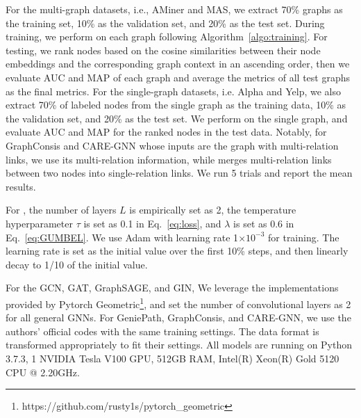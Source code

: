 For the multi-graph datasets, i.e., AMiner and MAS, we extract 70\% graphs as the training set, 10\% as the validation set, and 20\% as the test set. During training, we perform \smodel on each graph following Algorithm~\ref{algo:training}. For testing, we rank nodes based on the cosine similarities between their node embeddings and the corresponding graph context in an ascending order, then we evaluate AUC and MAP of each graph and average the metrics of all test graphs as the final metrics. 
For the single-graph datasets, i.e. Alpha and Yelp, we also extract 70\% of labeled nodes from the single graph as the training data, 10\% as the validation set, and 20\% as the test set. We perform \smodel on the single graph, and evaluate AUC and MAP for the ranked nodes in the test data. Notably, for GraphConsis and CARE-GNN whose inputs are the graph with multi-relation links, we use its multi-relation information, while \smodel merges multi-relation links between two nodes into single-relation links.
We run 5 trials and report the mean results.


For \smodel, the number of layers $L$ is empirically set as 2, the temperature hyperparameter $\tau$ is set as 0.1 in Eq.~\eqref{eq:loss}, and $\lambda$ is set as 0.6 in Eq.~\eqref{eq:GUMBEL}. We use Adam with learning rate 1$\times 10^{-3}$ for training. The learning rate is set as the initial value over the first 10\% steps, and then linearly decay to 1/10 of the initial value. 

For the GCN, GAT, GraphSAGE, and GIN, We leverage the implementations provided by Pytorch Geometric\footnote{https://github.com/rusty1s/pytorch\_geometric}, and set the number of convolutional layers as 2 for all general GNNs. For GeniePath, GraphConsis, and CARE-GNN, we use the authors' official codes with the same training settings. The data format is transformed appropriately to fit their settings. All models are running on Python 3.7.3, 1 NVIDIA Tesla V100 GPU, 512GB RAM, Intel(R) Xeon(R) Gold 5120 CPU @ 2.20GHz.


